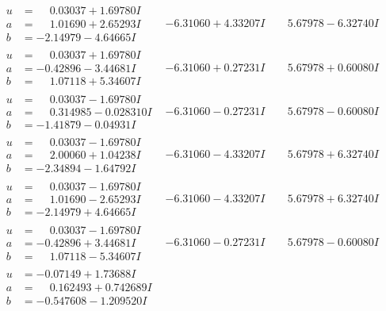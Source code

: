 \documentclass[1p]{elsarticle_modified}
\theoremstyle{definition}
\begin{document}
$$\begin{array}{c|c|c}
\begin{aligned}
u &= \phantom{-}0.03037 + 1.69780 I \\
a &= \phantom{-}1.01690 + 2.65293 I \\
b &= -2.14979 - 4.64665 I\end{aligned}
 & -6.31060 + 4.33207 I & \phantom{-}5.67978 - 6.32740 I \\ \hline\begin{aligned}
u &= \phantom{-}0.03037 + 1.69780 I \\
a &= -0.42896 - 3.44681 I \\
b &= \phantom{-}1.07118 + 5.34607 I\end{aligned}
 & -6.31060 + 0.27231 I & \phantom{-}5.67978 + 0.60080 I \\ \hline\begin{aligned}
u &= \phantom{-}0.03037 - 1.69780 I \\
a &= \phantom{-}0.314985 - 0.028310 I \\
b &= -1.41879 - 0.04931 I\end{aligned}
 & -6.31060 - 0.27231 I & \phantom{-}5.67978 - 0.60080 I \\ \hline\begin{aligned}
u &= \phantom{-}0.03037 - 1.69780 I \\
a &= \phantom{-}2.00060 + 1.04238 I \\
b &= -2.34894 - 1.64792 I\end{aligned}
 & -6.31060 - 4.33207 I & \phantom{-}5.67978 + 6.32740 I \\ \hline\begin{aligned}
u &= \phantom{-}0.03037 - 1.69780 I \\
a &= \phantom{-}1.01690 - 2.65293 I \\
b &= -2.14979 + 4.64665 I\end{aligned}
 & -6.31060 - 4.33207 I & \phantom{-}5.67978 + 6.32740 I \\ \hline\begin{aligned}
u &= \phantom{-}0.03037 - 1.69780 I \\
a &= -0.42896 + 3.44681 I \\
b &= \phantom{-}1.07118 - 5.34607 I\end{aligned}
 & -6.31060 - 0.27231 I & \phantom{-}5.67978 - 0.60080 I \\ \hline\begin{aligned}
u &= -0.07149 + 1.73688 I \\
a &= \phantom{-}0.162493 + 0.742689 I \\
b &= -0.547608 - 1.209520 I\end{aligned}

\end{array}$$
\end{document}
